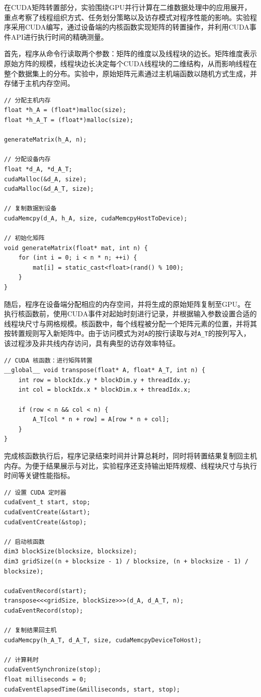 \documentclass[a4paper, utf8]{ctexart}
\begin{document}
	在CUDA矩阵转置部分，实验围绕GPU并行计算在二维数据处理中的应用展开，重点考察了线程组织方式、任务划分策略以及访存模式对程序性能的影响。实验程序采用CUDA编写，通过设备端的内核函数实现矩阵的转置操作，并利用CUDA事件API进行执行时间的精确测量。
	
	首先，程序从命令行读取两个参数：矩阵的维度以及线程块的边长。矩阵维度表示原始方阵的规模，线程块边长决定每个CUDA线程块的二维结构，从而影响线程在整个数据集上的分布。实验中，原始矩阵元素通过主机端函数以随机方式生成，并存储于主机内存空间。
	
	\begin{verbatim}
// 分配主机内存
float *h_A = (float*)malloc(size);
float *h_A_T = (float*)malloc(size);

generateMatrix(h_A, n);

// 分配设备内存
float *d_A, *d_A_T;
cudaMalloc(&d_A, size);
cudaMalloc(&d_A_T, size);

// 复制数据到设备
cudaMemcpy(d_A, h_A, size, cudaMemcpyHostToDevice);

// 初始化矩阵
void generateMatrix(float* mat, int n) {
    for (int i = 0; i < n * n; ++i) {
        mat[i] = static_cast<float>(rand() % 100);
    }
}
	\end{verbatim}
	
	随后，程序在设备端分配相应的内存空间，并将生成的原始矩阵复制至GPU。在执行核函数前，使用CUDA事件对起始时刻进行记录，并根据输入参数设置合适的线程块尺寸与网格规模。核函数中，每个线程被分配一个矩阵元素的位置，并将其按转置规则写入新矩阵中。由于访问模式为对\verb|A|的按行读取与对\verb|A_T|的按列写入，该过程涉及非共线内存访问，具有典型的访存效率特征。
	
	\begin{verbatim}
// CUDA 核函数：进行矩阵转置
__global__ void transpose(float* A, float* A_T, int n) {
    int row = blockIdx.y * blockDim.y + threadIdx.y;
    int col = blockIdx.x * blockDim.x + threadIdx.x;

    if (row < n && col < n) {
        A_T[col * n + row] = A[row * n + col];
    }
}
	\end{verbatim}
	
	完成核函数执行后，程序记录结束时间并计算总耗时，同时将转置结果复制回主机内存。为便于结果展示与对比，实验程序还支持输出矩阵规模、线程块尺寸与执行时间等关键性能指标。
	
	\begin{verbatim}
// 设置 CUDA 定时器
cudaEvent_t start, stop;
cudaEventCreate(&start);
cudaEventCreate(&stop);

// 启动核函数
dim3 blockSize(blocksize, blocksize);
dim3 gridSize((n + blocksize - 1) / blocksize, (n + blocksize - 1) / blocksize);

cudaEventRecord(start);
transpose<<<gridSize, blockSize>>>(d_A, d_A_T, n);
cudaEventRecord(stop);

// 复制结果回主机
cudaMemcpy(h_A_T, d_A_T, size, cudaMemcpyDeviceToHost);

// 计算耗时
cudaEventSynchronize(stop);
float milliseconds = 0;
cudaEventElapsedTime(&milliseconds, start, stop);
	\end{verbatim}
	
\end{document}
